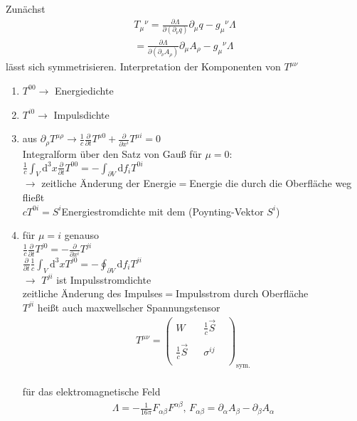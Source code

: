 \documentclass[a4paper]{article}
\begin{document}
Zunächst 
\begin{align}
T_\mu{}^\nu=\frac{\partial \Lambda}{\partial(\partial_\nu q)}\partial_\mu
q-g_\mu{}^\nu\Lambda\\
=\frac{\partial \Lambda}{\partial(\partial_\nu A_\rho)}\partial_\mu
A_\rho-g_\mu{}^\nu\Lambda
\end{align}
lässt sich symmetrisieren.
Interpretation der Komponenten von $T^{\mu\nu}$
\begin{enumerate}
  \item $T^{00} \rightarrow$ Energiedichte
  \item $T^{i0} \rightarrow$ Impulsdichte
  \item aus $\partial_\rho T^{\mu\rho} \rightarrow
  \frac{1}{c}\frac{\partial}{\partial t} T^{\mu 0}+\frac{\partial}{\partial
  x^i} T^{\mu i}=0$ \\ Integralform über den Satz von Gauß für $\mu=0$:\\
  $\frac{1}{c}\int_V \mathrm{d}^3x \frac{\partial}{\partial t} T^{0 0}=-\int_{\partial
  V} \mathrm{d}f_i T^{0i}$ \\ $\rightarrow$ zeitliche Änderung der Energie$=$Energie die
  durch die Oberfläche weg fließt\\ $cT^{0i}=S^i$Energiestromdichte mit dem
  (Poynting-Vektor $S^i$)
  \item für $\mu=i$ genauso \\ $\frac{1}{c}\frac{\partial}{\partial t}
  T^{j0}=-\frac{\partial}{\partial x^i} T^{ji}$\\ $\frac{\partial}{\partial
  t}\frac{1}{c}\int_V\mathrm{d}^3x T^{j0}=-\oint_{\partial V}\mathrm{d}f_i T^{ji}$\\$\rightarrow$
  $T^{ji}$ ist Impulsstromdichte\\zeitliche Änderung des Impulses$=$Impulsstrom
  durch Oberfläche \\ $T^{ji}$ heißt auch maxwellscher Spannungstensor
  \begin{align}
  T^{\mu\nu}=\begin{pmatrix}W&&\frac{1}{c}\vec{S}&\\&&&\\
  \frac{1}{c}\vec{S}&&\sigma^{ij}&\\&&&\end{pmatrix}_{\text{sym.}}
  \end{align}\\ für das elektromagnetische Feld \begin{align}
  \Lambda =-\frac{1}{16\pi}F_{\alpha\beta}F^{\alpha\beta} \text{,   }
  F_{\alpha\beta}=\partial_\alpha A_\beta-\partial_\beta A_\alpha \\

\end{align}
\end{enumerate}
\end{document}
